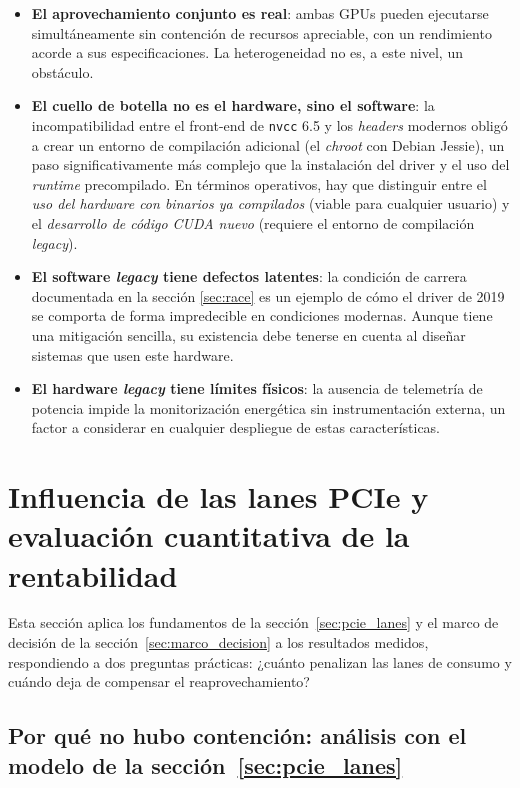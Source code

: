 \begin{itemize}
    \item \textbf{El aprovechamiento conjunto es real}: ambas GPUs pueden ejecutarse simultáneamente sin contención de recursos apreciable, con un rendimiento acorde a sus especificaciones. La heterogeneidad no es, a este nivel, un obstáculo.

    \item \textbf{El cuello de botella no es el hardware, sino el software}: la incompatibilidad entre el front-end de \texttt{nvcc} 6.5 y los \textit{headers} modernos obligó a crear un entorno de compilación adicional (el \textit{chroot} con Debian Jessie), un paso significativamente más complejo que la instalación del driver y el uso del \textit{runtime} precompilado. En términos operativos, hay que distinguir entre el \emph{uso del hardware con binarios ya compilados} (viable para cualquier usuario) y el \emph{desarrollo de código CUDA nuevo} (requiere el entorno de compilación \textit{legacy}).

    \item \textbf{El software \textit{legacy} tiene defectos latentes}: la condición de carrera documentada en la sección \ref{sec:race} es un ejemplo de cómo el driver de 2019 se comporta de forma impredecible en condiciones modernas. Aunque tiene una mitigación sencilla, su existencia debe tenerse en cuenta al diseñar sistemas que usen este hardware.

    \item \textbf{El hardware \textit{legacy} tiene límites físicos}: la ausencia de telemetría de potencia impide la monitorización energética sin instrumentación externa, un factor a considerar en cualquier despliegue de estas características.
\end{itemize}

\section{Influencia de las lanes PCIe y evaluación cuantitativa de la rentabilidad} \label{sec:pcie_evaluacion}

Esta sección aplica los fundamentos de la sección~\ref{sec:pcie_lanes} y el marco de decisión de la sección~\ref{sec:marco_decision} a los resultados medidos, respondiendo a dos preguntas prácticas: ¿cuánto penalizan las lanes de consumo y cuándo deja de compensar el reaprovechamiento?

\subsection{Por qué no hubo contención: análisis con el modelo de la sección~\ref{sec:pcie_lanes}}

